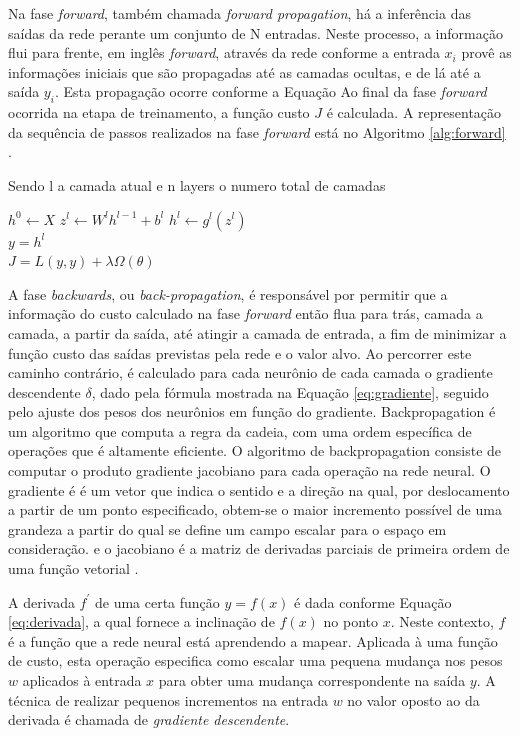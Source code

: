 Na fase \emph{forward}, também chamada \emph{forward propagation}, há a inferência das saídas da rede perante um conjunto de N entradas. Neste processo, a informação flui para frente, em inglês \emph{forward}, através da rede conforme a entrada $x_i$ provê as informações iniciais que são propagadas até as camadas ocultas, e de lá até a saída $y_i$. Esta propagação ocorre conforme a Equação  Ao final da fase \emph{forward} ocorrida na etapa de treinamento, a função custo $J$ é calculada. A representação da sequência de passos realizados na fase \emph{forward} está no Algoritmo \ref{alg:forward} \cite{haykin2009neural, goodfellow2016deep}.

Sendo l a camada atual e n layers o numero total de camadas

\begin{algorithm}\label{alg:forward}
\begin{algorithmic}
	\State $h^0\gets X$
		\State $z^l \gets W^l h^{l-1} + b^l$
		\State $h^l \gets g^l(z^l)$
	\EndFor\\
	$y = h^l$\\
	$J = L(y, y) + \lambda \Omega(\theta)$
\end{algorithmic}
\end{algorithm}

A fase \emph{backwards}, ou \emph{back-propagation}, é responsável por permitir que a informação do custo calculado na fase \emph{forward} então flua para trás, camada a camada, a partir da saída, até atingir a camada de entrada, a fim de minimizar a função custo das saídas previstas pela rede e o valor alvo. Ao percorrer este caminho contrário, é calculado para cada neurônio de cada camada o gradiente descendente $\delta$, dado pela fórmula mostrada na Equação \ref{eq:gradiente}, seguido pelo ajuste dos pesos dos neurônios em função do gradiente.
Backpropagation é um algoritmo que computa a regra da cadeia, com uma ordem específica de operações que é altamente eficiente. O algoritmo de backpropagation consiste de computar o produto gradiente jacobiano para cada operação na rede neural. O gradiente é é um vetor que indica o sentido e a direção na qual, por deslocamento a partir de um ponto especificado, obtem-se o maior incremento possível de uma grandeza a partir do qual se define um campo escalar para o espaço em consideração. e o jacobiano é a matriz de derivadas parciais de primeira ordem de uma função vetorial .

A derivada $f^\prime$ de uma certa função $y = f(x)$ é dada conforme Equação \ref{eq:derivada}, a qual fornece a inclinação de $f(x)$ no ponto $x$. Neste contexto, $f$ é a função que a rede neural está aprendendo a mapear. Aplicada à uma função de custo, esta operação especifica como escalar uma pequena mudança nos pesos $w$ aplicados à entrada $x$ para obter uma mudança correspondente na saída $y$. A técnica de realizar pequenos incrementos na entrada $w$ no valor oposto ao da derivada é chamada de \emph{gradiente descendente}. 

